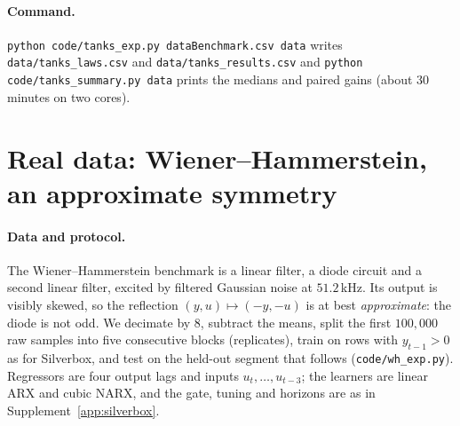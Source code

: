 \paragraph{Command.} \texttt{python code/tanks\_exp.py dataBenchmark.csv data} writes \texttt{data/tanks\_laws.csv} and \texttt{data/tanks\_results.csv} and \texttt{python code/tanks\_summary.py data} prints the medians and paired gains (about 30 minutes on two cores).


\section{Real data: Wiener--Hammerstein, an approximate symmetry}\label{app:wh}
\paragraph{Data and protocol.} The Wiener--Hammerstein benchmark \citep{schoukens2009wh} is a linear filter, a diode circuit and a second linear filter, excited by filtered Gaussian noise at $51.2$\,kHz. Its output is visibly skewed, so the reflection $(y,u)\mapsto(-y,-u)$ is at best \emph{approximate}: the diode is not odd. We decimate by $8$, subtract the means, split the first $100{,}000$ raw samples into five consecutive blocks (replicates), train on rows with $y_{t-1}>0$ as for Silverbox, and test on the held-out segment that follows (\texttt{code/wh\_exp.py}). Regressors are four output lags and inputs $u_t,\dots,u_{t-3}$; the learners are linear ARX and cubic NARX, and the gate, tuning and horizons are as in Supplement~\ref{app:silverbox}.

